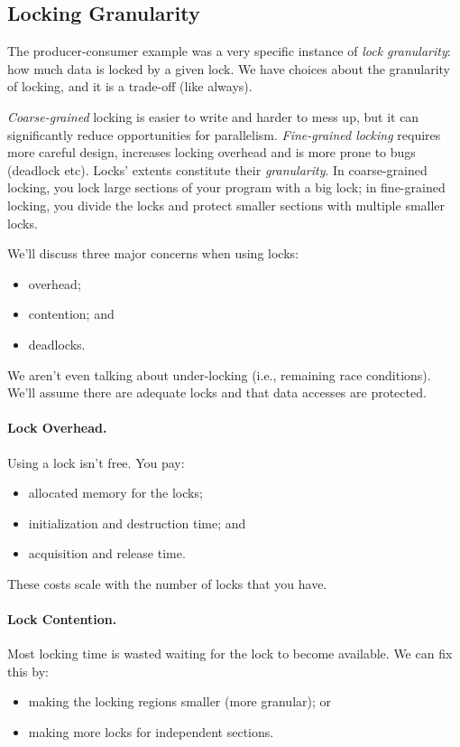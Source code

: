 \subsection*{Locking Granularity}

The producer-consumer example was a very specific instance of \textit{lock granularity}: how much data is locked by a given lock. We have choices about the granularity of locking, and it is a trade-off (like always).

\textit{Coarse-grained} locking is easier to write and harder to mess up, but it can significantly reduce opportunities for parallelism. \textit{
Fine-grained locking} requires more careful design,
increases locking overhead and is more prone to bugs (deadlock etc).
Locks' extents constitute their {\it granularity}. In coarse-grained locking, you
lock large sections of your program with a big lock; in fine-grained
locking, you divide the locks and protect smaller sections with multiple smaller locks.

We'll discuss three major concerns when using locks:
  \begin{itemize}
    \item overhead;
    \item contention; and
    \item deadlocks.
  \end{itemize}
We aren't even talking about under-locking (i.e., remaining race conditions). We'll assume there are adequate locks and that data accesses are protected.

\paragraph{Lock Overhead.}
  Using a lock isn't free. You pay:
  \begin{itemize}
    \item allocated memory for the locks;
    \item initialization and destruction time; and
    \item acquisition and release time.
  \end{itemize}
  These costs scale with the number of locks that you have.

\paragraph{Lock Contention.}
 Most locking time is wasted waiting for the lock to become available.
We can fix this by:
      \begin{itemize}
        \item making the locking regions smaller (more granular); or
        \item making more locks for independent sections.
      \end{itemize}

